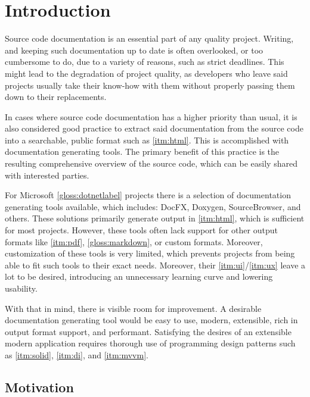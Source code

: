 \chapter*{Introduction}

Source code documentation is an essential part of any quality project. Writing, and keeping such documentation up to date is often overlooked, or too cumbersome to do, due to a variety of reasons, such as strict deadlines. This might lead to the degradation of project quality, as developers who leave said projects usually take their know-how with them without properly passing them down to their replacements.

In cases where source code documentation has a higher priority than usual, it is also considered good practice to extract said documentation from the source code into a searchable, public format such as \ref{itm:html}. This is accomplished with documentation generating tools. The primary benefit of this practice is the resulting comprehensive overview of the source code, which can be easily shared with interested parties.

For Microsoft \ref{gloss:dotnetlabel} projects there is a selection of documentation generating tools available, which includes: DocFX, Doxygen, SourceBrowser, and others. These solutions primarily generate output in \ref{itm:html}, which is sufficient for most projects. However, these tools often lack support for other output formats like \ref{itm:pdf}, \ref{gloss:markdown}, or custom formats. Moreover, customization of these tools is very limited, which prevents projects from being able to fit such tools to their exact needs. Moreover, their \ref{itm:ui}/\ref{itm:ux} leave a lot to be desired, introducing an unnecessary learning curve and lowering usability.

With that in mind, there is visible room for improvement. A desirable documentation generating tool would be easy to use, modern, extensible, rich in output format support, and performant. Satisfying the desires of an extensible modern application requires thorough use of programming design patterns such as \ref{itm:solid}, \ref{itm:di}, and \ref{itm:mvvm}.

\section*{Motivation}

